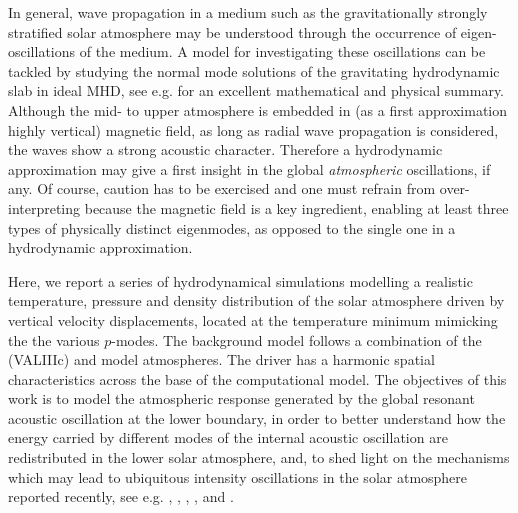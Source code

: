 \documentclass[preprint,authoryear,12pt]{elsarticle}
\begin{document}
In general, wave propagation in a medium such as the gravitationally strongly stratified solar atmosphere may be understood through the occurrence of eigen-oscillations of the medium. A model for investigating these oscillations can be tackled by studying the normal mode solutions of the gravitating  hydrodynamic slab in ideal MHD, see e.g. \citet{Goedbloed2004} for an excellent mathematical and physical summary. Although the mid- to upper atmosphere is embedded in (as a first approximation highly vertical) magnetic field, as long as radial wave propagation is considered, the waves show a strong acoustic character. Therefore a hydrodynamic approximation may give a first insight in the global {\it atmospheric} oscillations, if any. Of course, caution has to be exercised and one must refrain from over-interpreting because the magnetic field is a key ingredient, enabling at least three types of physically distinct eigenmodes, as opposed to the single one in a hydrodynamic approximation.

Here, we report a series of hydrodynamical simulations modelling a realistic temperature, pressure and density distribution of the solar atmosphere driven by vertical velocity displacements,  located at the temperature minimum mimicking the the various $p$-modes. The background model follows a combination of the \citet{Vernazza1981} (VALIIIc) and \citet{McWhirter1975} model atmospheres. The driver has a harmonic spatial characteristics across the base of the computational model. The objectives of this work is to model the atmospheric response generated by the global resonant acoustic oscillation at the lower boundary, in order to better understand how the energy carried by different modes of the internal acoustic oscillation are redistributed in the lower solar atmosphere, and, to shed light on the mechanisms which may lead to ubiquitous intensity oscillations in the solar atmosphere reported recently, see e.g. \citet{Kosovichev2016A}, \citet{Kosovichev2016B}, \citet{Didkovsky2013}, \citet{Didkovsky2013}, \citet{Ireland2015} and \citet{Erdelyi2017}.   
\end{document}
